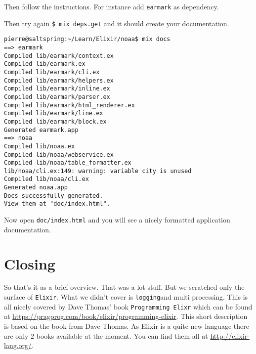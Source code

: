 \documentclass[10pt, a4paper]{article}
\newcommand{\includecode}[3]{}
\begin{document}
Then follow the instructions. For instance add \texttt{earmark} as 
dependency.

\includecode{mix.exs}{lst:mix4}{listings/mix4.exs}

Then try again \texttt{\$ mix deps.get} and it should create your 
documentation.

\begin{verbatim}
pierre@saltspring:~/Learn/Elixir/noaa$ mix docs
==> earmark
Compiled lib/earmark/context.ex
Compiled lib/earmark.ex
Compiled lib/earmark/cli.ex
Compiled lib/earmark/helpers.ex
Compiled lib/earmark/inline.ex
Compiled lib/earmark/parser.ex
Compiled lib/earmark/html_renderer.ex
Compiled lib/earmark/line.ex
Compiled lib/earmark/block.ex
Generated earmark.app
==> noaa
Compiled lib/noaa.ex
Compiled lib/noaa/webservice.ex
Compiled lib/noaa/table_formatter.ex
lib/noaa/cli.ex:149: warning: variable city is unused
Compiled lib/noaa/cli.ex
Generated noaa.app
Docs successfully generated.
View them at "doc/index.html".
\end{verbatim}

Now open \texttt{doc/index.html} and you will see a nicely formatted 
application documentation.

\section{Closing}
So that's it as a brief overview. That was a lot stuff. But we scratched
only the surface of \texttt{Elixir}. What we didn't cover is 
\texttt{logging}and multi processing. This is all nicely covered by 
Dave Thomas' book \texttt{Programming Elixr} which can be found at 
\url{https://pragprog.com/book/elixir/programming-elixir}. This short 
description is based on the book from Dave Thomas. As Elixir is a quite new 
language there are only 2 books
available at the moment. You can find them all at \url{http://elixir-lang.org/}. 
\end{document}
